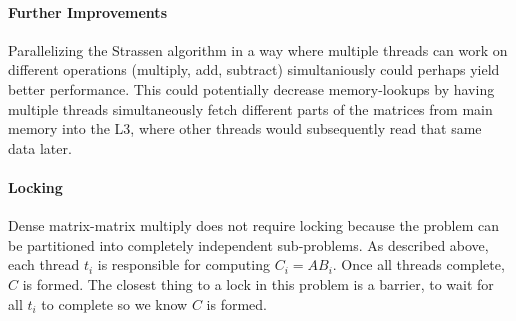 \documentclass{article}
\begin{document}
\paragraph{Further Improvements}
Parallelizing the Strassen algorithm in a way where multiple threads can work on different operations (multiply, add, subtract) simultaniously could perhaps yield better performance. This could potentially decrease memory-lookups by having multiple threads simultaneously fetch different parts of the matrices from main memory into the L3, where other threads would subsequently read that same data later.

\paragraph{Locking}
Dense matrix-matrix multiply does not require locking because the problem can be partitioned into completely independent sub-problems. As described above, each thread $t_{i}$ is responsible for computing $C_{i} = AB_{i}$. Once all threads complete, $C$ is formed. The closest thing to a lock in this problem is a barrier, to wait for all $t_{i}$ to complete so we know $C$ is formed.
\end{document}
